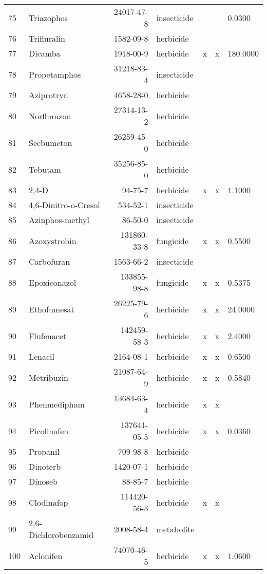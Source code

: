 \begin{longtable}{lp{3cm}rlp{0.5cm}p{0.5cm}p{1.5cm}}
  75 & Triazophos & 24017-47-8 & insecticide &  &  & 0.0300 \\ 
  76 & Trifluralin & 1582-09-8 & herbicide &  &  &  \\ 
  77 & Dicamba & 1918-00-9 & herbicide & x & x & 180.0000 \\ 
  78 & Propetamphos & 31218-83-4 & insecticide &  &  &  \\ 
  79 & Aziprotryn & 4658-28-0 & herbicide &  &  &  \\ 
  80 & Norflurazon & 27314-13-2 & herbicide &  &  &  \\ 
  81 & Secbumeton & 26259-45-0 & herbicide &  &  &  \\ 
  82 & Tebutam & 35256-85-0 & herbicide &  &  &  \\ 
  83 & 2,4-D & 94-75-7 & herbicide & x & x & 1.1000 \\ 
  84 & 4,6-Dinitro-o-Cresol & 534-52-1 & insecticide &  &  &  \\ 
  85 & Azinphos-methyl & 86-50-0 & insecticide &  &  &  \\ 
  86 & Azoxystrobin & 131860-33-8 & fungicide & x & x & 0.5500 \\ 
  87 & Carbofuran & 1563-66-2 & insecticide &  &  &  \\ 
  88 & Epoxiconazol & 133855-98-8 & fungicide & x & x & 0.5375 \\ 
  89 & Ethofumesat & 26225-79-6 & herbicide & x & x & 24.0000 \\ 
  90 & Flufenacet & 142459-58-3 & herbicide & x & x & 2.4000 \\ 
  91 & Lenacil & 2164-08-1 & herbicide & x & x & 0.6500 \\ 
  92 & Metribuzin & 21087-64-9 & herbicide & x & x & 0.5840 \\ 
  93 & Phenmedipham & 13684-63-4 & herbicide & x & x &  \\ 
  94 & Picolinafen & 137641-05-5 & herbicide & x & x & 0.0360 \\ 
  95 & Propanil & 709-98-8 & herbicide &  &  &  \\ 
  96 & Dinoterb & 1420-07-1 & herbicide &  &  &  \\ 
  97 & Dinoseb & 88-85-7 & herbicide &  &  &  \\ 
  98 & Clodinafop & 114420-56-3 & herbicide & x & x &  \\ 
  99 & 2,6-Dichlorobenzamid & 2008-58-4 & metabolite &  &  &  \\ 
  100 & Aclonifen & 74070-46-5 & herbicide & x & x & 1.0600 \\ 

\end{longtable}

